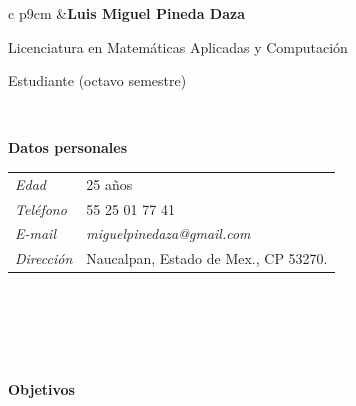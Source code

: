 \documentclass[10pt]{article}
\begin{document}
\pagestyle{empty}
\thispagestyle{empty}


\begin{tabular}{c p{9cm} }
&{\Large \textbf{Luis Miguel Pineda Daza}}

Licenciatura en Matem\'aticas Aplicadas y Computaci\'on 

Estudiante (octavo semestre)

\ 

{\large \textbf{Datos personales}}


\begin{tabular}{p{3cm} l}


\emph{Edad}&25 a\~nos\\

\emph{Tel\'efono} &55 25 01 77 41\\

\emph{E-mail}&
\textit{miguelpinedaza@gmail.com}\\

\emph{Direcci\'on}&Naucalpan, Estado de
Mex., CP 53270. \\



\end{tabular}
\end{tabular}
\\
\\
\\

\ 

\begin{large}
\textbf{Objetivos}
\end{large}



\end{document}
